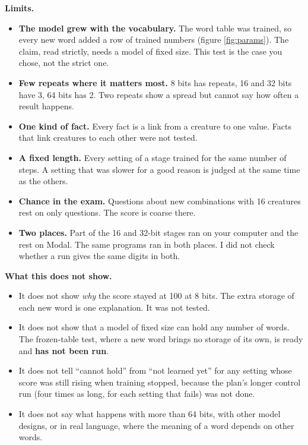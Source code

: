 \textbf{Limits.}
\begin{itemize}
\item \textbf{The model grew with the vocabulary.} The word table was trained, so every new word
  added a row of  trained numbers (figure \ref{fig:params}). The claim, read
  strictly, needs a model of fixed size. This test is the case you chose, not the strict one.
\item \textbf{Few repeats where it matters most.} 8 bits has  repeats, 16 and 32 bits
  have 3, 64 bits has 2. Two repeats show a spread but cannot say how often a result happens.
\item \textbf{One kind of fact.} Every fact is a link from a creature to one value. Facts that
  link creatures to each other were not tested.
\item \textbf{A fixed length.} Every setting of a stage trained for the same number of steps. A
  setting that was slower for a good reason is judged at the same time as the others.
\item \textbf{Chance in the exam.} Questions about new combinations with 16 creatures rest on
  only  questions. The score is coarse there.
\item \textbf{Two places.} Part of the 16 and 32-bit stages ran on your computer and the rest on
  Modal. The same programs ran in both places. I did not check whether a run gives the same digits in
  both.
\end{itemize}

\textbf{What this does not show.}
\begin{itemize}
\item It does not show \emph{why} the score stayed at 100 at 8 bits. The extra storage of each new
  word is one explanation. It was not tested.
\item It does not show that a model of fixed size can hold any number of words. The frozen-table
  test, where a new word brings no storage of its own, is ready and \textbf{has not been run}.
\item It does not tell ``cannot hold'' from ``not learned yet'' for any setting whose score was
  still rising when training stopped, because the plan's longer control run (four times as long, for
  each setting that fails) was not done.
\item It does not say what happens with more than 64 bits, with other model designs, or in real
  language, where the meaning of a word depends on other words.
\end{itemize}

